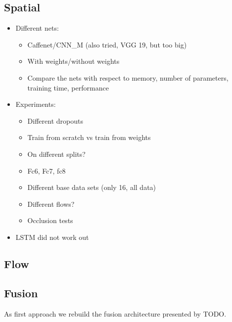 \subsection{Spatial}
\label{subsec:spatial}

\begin{itemize}
	\item
		Different nets:
		\begin{itemize}
			\item Caffenet/CNN\_M (also tried, VGG 19, but too big)
			\item With weights/without weights
			\item Compare the nets with respect to memory, number of parameters, training time, performance
		\end{itemize}
	\item
		Experiments:
		\begin{itemize}
			\item Different dropouts
			\item Train from scratch vs train from weights
			\item On different splits?
			\item Fc6, Fc7, fc8
			\item Different base data sets (only 16, all data)
			\item Different flows?
			\item Occlusion tests
		\end{itemize}
	\item
		LSTM did not work out
\end{itemize}


\subsection{Flow}
\label{subsec:flow}


\subsection{Fusion}
\label{subsec:fusion}
As first approach we rebuild the fusion architecture presented by TODO.

